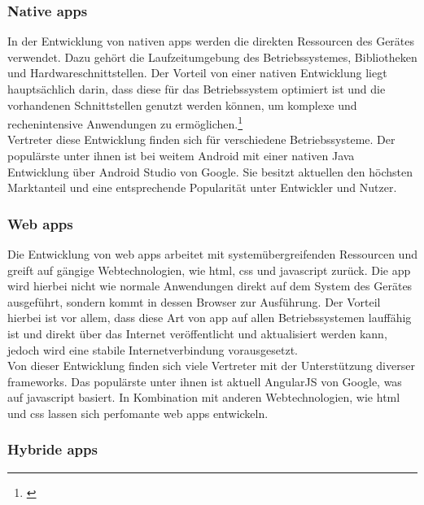 \subsubsection{Native \glspl{app}}\label{native}

In der Entwicklung von nativen \glspl{app} werden die direkten Ressourcen des Gerätes verwendet. Dazu gehört die Laufzeitumgebung des Betriebssystemes, Bibliotheken und Hardwareschnittstellen. Der Vorteil von einer nativen Entwicklung liegt hauptsächlich darin, dass diese für das Betriebssystem optimiert ist und die vorhandenen Schnittstellen genutzt werden können, um komplexe und rechenintensive Anwendungen zu ermöglichen.\footnote{\citep[vgl.][Unterschiede und Vergleich native Apps vs. Web Apps]{DanielWurstl.Unterschiedeund}\label{note1}}\\
Vertreter diese Entwicklung finden sich für verschiedene Betriebssysteme. Der populärste unter ihnen ist bei weitem Android mit einer nativen Java Entwicklung über Android Studio von Google. Sie besitzt aktuellen den höchsten Marktanteil und eine entsprechende Popularität unter Entwickler und Nutzer.

\subsubsection{Web \glspl{app}}\label{web}

Die Entwicklung von web \glspl{app} arbeitet mit systemübergreifenden Ressourcen und greift auf gängige Webtechnologien, wie \gls{html}, \gls{css} und \gls{javascript} zurück. Die \gls{app} wird hierbei nicht wie normale Anwendungen direkt auf dem System des Gerätes ausgeführt, sondern kommt in dessen Browser zur Ausführung. Der Vorteil hierbei ist vor allem, dass diese Art von \gls{app} auf allen Betriebssystemen lauffähig ist und direkt über das Internet veröffentlicht und aktualisiert werden kann, jedoch wird eine stabile Internetverbindung vorausgesetzt.\\
Von dieser Entwicklung finden sich viele Vertreter mit der Unterstützung diverser \glspl{framework}. Das populärste unter ihnen ist aktuell AngularJS von Google, was auf \gls{javascript} basiert. In Kombination mit anderen Webtechnologien, wie \gls{html} und \gls{css} lassen sich perfomante web \glspl{app} entwickeln.

\subsubsection{Hybride \glspl{app}}\label{hybride}

